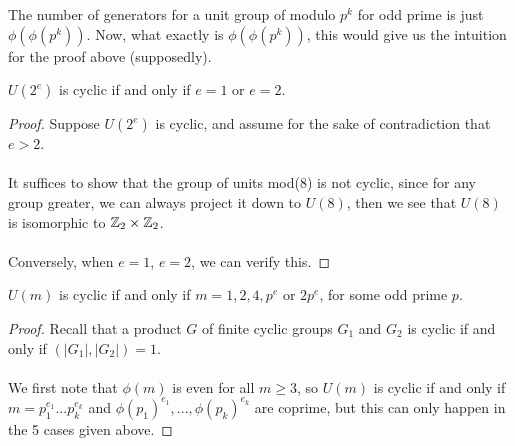 \begin{remark}
The number of generators for a unit group of modulo $p^k$ for odd prime is just $\phi(\phi(p^k))$. Now, what exactly is $\phi(\phi(p^k))$, this would give us the intuition for the proof above (supposedly).
\end{remark}

\begin{theorem}
$U(2^e)$ is cyclic if and only if $e = 1$ or $e = 2$.
\end{theorem}

\begin{proof}
Suppose $U(2^e)$ is cyclic, and assume for the sake of contradiction that $e > 2$.\\\\
It suffices to show that the group of units mod(8) is not cyclic, since for any group greater, we can always project it down to $U(8)$, then we see that $U(8)$ is isomorphic to $\mathbb{Z}_2 \times \mathbb{Z}_2$.\\\\
Conversely, when $e = 1$, $e= 2$, we can verify this.
\end{proof}


\begin{corollary}
$U(m)$ is cyclic if and only if $m = 1, 2, 4, p^e$ or $2p^e$, for some odd prime $p$.
\end{corollary}

\begin{proof}
Recall that a product $G$ of finite cyclic groups $G_1$ and $G_2$ is cyclic if and only if $(|G_1|, |G_2|) = 1$.\\\\
We first note that $\phi(m)$ is even for all $m \geq 3$, so $U(m)$ is cyclic if and only if $m = p_1^{e_1}...p_k^{e_k}$ and $\phi(p_1)^{e_1}, ..., \phi(p_k)^{e_k}$ are coprime, but this can only happen in the 5 cases given above.
\end{proof}